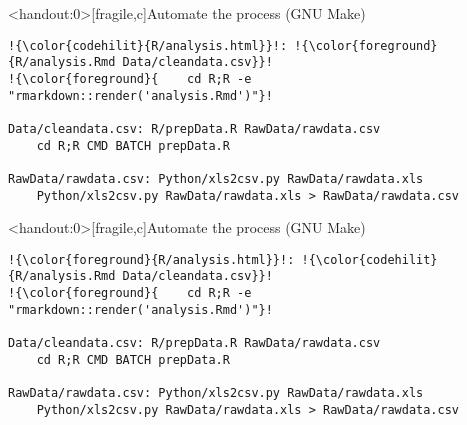 \documentclass[aspectratio=169,12pt,t]{beamer}
\begin{document}
\begin{frame}<handout:0>[fragile,c]{Automate the process (GNU Make)}

\addtocounter{framenumber}{-1}

\begin{center}
\begin{minipage}[c]{13.8cm}
\begin{semiverbatim}
\lstset{basicstyle=\footnotesize}
\begin{lstlisting}[escapechar=!,linewidth=13.8cm]
!{\color{codehilit}{R/analysis.html}}!: !{\color{foreground}{R/analysis.Rmd Data/cleandata.csv}}!
!{\color{foreground}{    cd R;R -e "rmarkdown::render('analysis.Rmd')"}!

Data/cleandata.csv: R/prepData.R RawData/rawdata.csv
    cd R;R CMD BATCH prepData.R

RawData/rawdata.csv: Python/xls2csv.py RawData/rawdata.xls
    Python/xls2csv.py RawData/rawdata.xls > RawData/rawdata.csv
\end{lstlisting}
\end{semiverbatim}
\end{minipage}
\end{center}

\end{frame}



\begin{frame}<handout:0>[fragile,c]{Automate the process (GNU Make)}

\addtocounter{framenumber}{-1}

\begin{center}
\begin{minipage}[c]{13.8cm}
\begin{semiverbatim}
\lstset{basicstyle=\footnotesize}
\begin{lstlisting}[escapechar=!,linewidth=13.8cm]
!{\color{foreground}{R/analysis.html}}!: !{\color{codehilit}{R/analysis.Rmd Data/cleandata.csv}}!
!{\color{foreground}{    cd R;R -e "rmarkdown::render('analysis.Rmd')"}!

Data/cleandata.csv: R/prepData.R RawData/rawdata.csv
    cd R;R CMD BATCH prepData.R

RawData/rawdata.csv: Python/xls2csv.py RawData/rawdata.xls
    Python/xls2csv.py RawData/rawdata.xls > RawData/rawdata.csv
\end{lstlisting}
\end{semiverbatim}
\end{minipage}
\end{center}
\end{frame}
\end{document}
